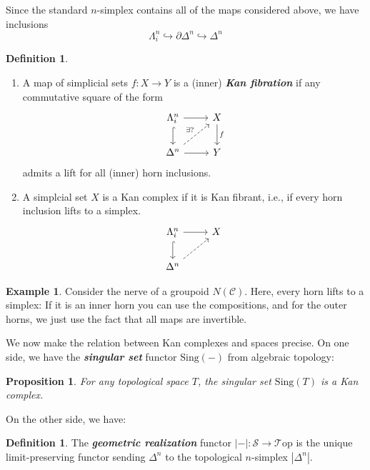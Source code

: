 \documentclass{article}
\newcommand{\textbi}[1]{\textbf{\textit{#1}}}
\newcommand{\C}{\mathscr{C}}
\newcommand{\cS}{\mathcal{S}}
\newcommand{\Top}{\mathscr{T}\mathrm{op}}
\newtheorem{prop}[subsection]{Proposition}
\theoremstyle{definition}
\newtheorem{defin}[subsection]{Definition}
\newtheorem{ex}[subsection]{Example}
\begin{document}
\par Since the standard $n$-simplex contains all of the maps considered above, we have inclusions $$\Lambda^n_i\hookrightarrow\partial\Delta^n\hookrightarrow\Delta^n$$

\begin{defin}
    \begin{enumerate}
        \item A map of simplicial sets $f:X\to Y$ is a (inner) \textbi{Kan fibration} if any commutative square of the form 
        \[\begin{tikzcd}
            \Lambda^n_i \arrow[r] \arrow[d, hook] & X \arrow[d, "f"] \\
            \Delta^n \arrow[ru, dashed, "\exists ?"] \arrow[r] & Y
        \end{tikzcd}\]
        admits a lift for all (inner) horn inclusions.
        \item A simplcial set $X$ is a Kan complex if it is Kan fibrant, i.e., if every horn inclusion lifts to a simplex.
        \[\begin{tikzcd}
            \Lambda^n_i \arrow[r] \arrow[d, hook] & X \\
            \Delta^n \arrow[ur, dashed]
        \end{tikzcd}\]
    \end{enumerate}   
\end{defin}

\begin{ex}
    Consider the nerve of a groupoid $N(\C)$. Here, every horn lifts to a simplex: If it is an inner horn you can use the compositions, and for the outer horns, we just use the fact that all maps are invertible.
\end{ex}

We now make the relation between Kan complexes and spaces precise. On one side, we have the \textbi{singular set} functor $\text{Sing}(-)$ from algebraic topology:

\begin{prop}
    For any topological space $T$, the singular set $\text{Sing}(T)$ is a Kan complex.
\end{prop}

On the other side, we have:

\begin{defin}
    The \textbi{geometric realization} functor $|-|:\cS\to \Top$ is the unique limit-preserving functor sending $\Delta^n$ to the topological $n$-simplex $|\Delta^n|$.
\end{defin}
\end{document}
